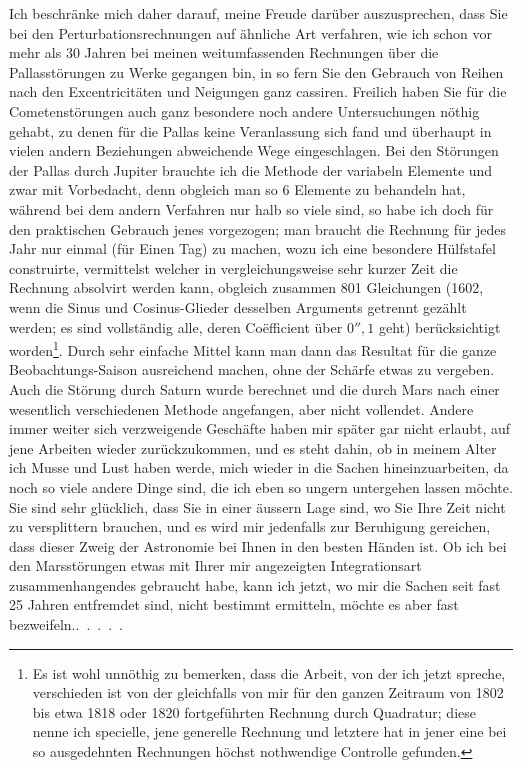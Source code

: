 \par Ich beschränke mich daher darauf, meine Freude darüber auszusprechen, dass Sie bei den Perturbationsrechnungen auf ähnliche Art verfahren, wie ich schon vor mehr als 30 Jahren bei meinen weitumfassenden Rechnungen über die Pallasstörungen zu Werke gegangen bin, in so fern Sie den Gebrauch von Reihen nach den Excentricitäten und Neigungen ganz cassiren. Freilich haben Sie für die Cometenstörungen auch ganz besondere noch andere Untersuchungen nöthig gehabt, zu denen für die Pallas keine Veranlassung sich fand und überhaupt in vielen andern Beziehungen abweichende Wege eingeschlagen. Bei den Störungen der Pallas durch Jupiter brauchte ich die Methode der variabeln Elemente und zwar mit Vorbedacht, denn obgleich man so 6 Elemente zu behandeln hat, während bei dem andern Verfahren nur halb so viele sind, so habe ich doch für den praktischen Gebrauch jenes vorgezogen; man braucht die Rechnung für jedes Jahr nur einmal (für Einen Tag) zu machen, wozu ich eine besondere Hülfstafel construirte, vermittelst welcher in vergleichungsweise sehr kurzer Zeit die Rechnung absolvirt werden kann, obgleich zusammen 801 Gleichungen (1602, wenn die Sinus und Cosinus-Glieder desselben Arguments getrennt gezählt werden; es sind vollständig alle, deren Coëfficient über \(0''{,}1\) geht) berücksichtigt worden\footnote{Es ist wohl unnöthig zu bemerken, dass die Arbeit, von der ich jetzt spreche,  verschieden ist von der gleichfalls von mir für den ganzen Zeitraum von 1802 bis etwa 1818 oder 1820 fortgeführten Rechnung durch Quadratur; diese nenne ich specielle, jene generelle Rechnung und letztere hat in jener eine bei so ausgedehnten Rechnungen höchst nothwendige Controlle gefunden.}. Durch sehr einfache Mittel kann man dann das Resultat für die ganze Beobachtungs-Saison ausreichend machen, ohne der Schärfe etwas zu vergeben. Auch die Störung durch Saturn wurde berechnet und die durch Mars nach einer wesentlich verschiedenen Methode angefangen, aber nicht vollendet. Andere immer weiter sich verzweigende Geschäfte haben mir später gar nicht erlaubt, auf jene Arbeiten wieder zurückzukommen, und es steht dahin, ob in meinem Alter ich Musse und Lust haben werde, mich wieder in die Sachen hineinzuarbeiten, da noch so viele andere Dinge sind, die ich eben so ungern untergehen lassen möchte. Sie sind sehr glücklich, dass Sie in einer äussern Lage sind, wo Sie Ihre Zeit nicht zu versplittern brauchen, und es wird mir jedenfalls zur Beruhigung gereichen, dass dieser Zweig der Astronomie bei Ihnen in den besten Händen ist. Ob ich bei den Marsstörungen etwas mit Ihrer mir angezeigten Integrationsart zusammenhangendes gebraucht habe, kann ich jetzt, wo mir die Sachen seit fast 25 Jahren entfremdet sind, nicht bestimmt ermitteln, möchte es aber fast bezweifeln.\quad\mbox{. . . . .}
\par
